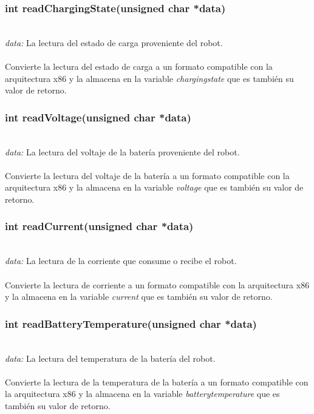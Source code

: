 \documentclass[letterpaper]{book}
\begin{document}
\subsubsection{int readChargingState(unsigned char *data)}\mbox{}\\
\emph{data: }La lectura del estado de carga proveniente del robot.\\\\
Convierte la lectura del estado de carga a un formato compatible con la arquitectura x86 y la almacena en la variable \emph{chargingstate} que es también su valor de retorno.\\ 

\subsubsection{int readVoltage(unsigned char *data)}\mbox{}\\
\emph{data: }La lectura del voltaje de la batería proveniente del robot.\\\\
Convierte la lectura del voltaje de la batería a un formato compatible con la arquitectura x86 y la almacena en la variable \emph{voltage} que es también su valor de retorno.\\ 

\subsubsection{int readCurrent(unsigned char *data)}\mbox{}\\
\emph{data: }La lectura de la corriente que consume o recibe el robot.\\\\
Convierte la lectura de corriente a un formato compatible con la arquitectura x86 y la almacena en la variable \emph{current} que es también su valor de retorno.\\ 

\subsubsection{int readBatteryTemperature(unsigned char *data)}\mbox{}\\
\emph{data: }La lectura del temperatura de la batería del robot.\\\\
Convierte la lectura de la temperatura de la batería a un formato compatible con la arquitectura x86 y la almacena en la variable \emph{batterytemperature} que es también su valor de retorno.\\ 
\end{document}
